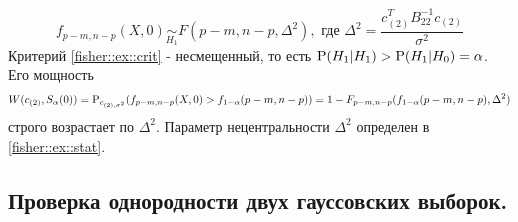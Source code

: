 \begin{equation}\label{fisher::ex::stat}
    f_{p-m,n-p}(X,0)\underset{H_1}{\sim} F(p-m,n-p, \Delta^2),\text{ где }\Delta^2=\frac{c_{(2)}^TB_{22}^{-1}c_{(2)}}{\sigma^2}
\end{equation}
Критерий \ref{fisher::ex::crit} - несмещенный, то есть $\P(H_1\vert H_1)>\P(H_1\vert H_0)=\alpha$. Его мощность
\[W(c_{(2)}, S_{\alpha}(0))=\P_{c_{(2), \sigma^2}}(f_{p-m,n-p}(X,0)>f_{1-\alpha}(p-m,n-p))=1-F_{p-m,n-p}(f_{1-\alpha}(p-m,n-p),\Delta^2)\]
строго возрастает по $\Delta^2$. Параметр нецентральности $\Delta^2$ определен в \ref{fisher::ex::stat}.

\subsection{Проверка однородности двух гауссовских выборок.}
